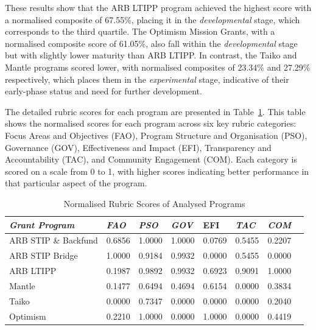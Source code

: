 \documentclass[conference]{IEEEtran}
\begin{document}
These results show that the ARB LTIPP program achieved the highest score with a normalised composite of 67.55\%, placing it in the \textit{developmental} stage, which corresponds to the third quartile. The Optimism Mission Grants, with a normalised composite score of 61.05\%, also fall within the \textit{developmental} stage but with slightly lower maturity than ARB LTIPP. In contrast, the Taiko and Mantle programs scored lower, with normalised composites of 23.34\% and 27.29\% respectively, which places them in the \textit{experimental} stage, indicative of their early-phase status and need for further development.

The detailed rubric scores for each program are presented in Table~\ref{tab:rubric_scores}. This table shows the normalised scores for each program across six key rubric categories: Focus Areas and Objectives (FAO), Program Structure and Organisation (PSO), Governance (GOV), Effectiveness and Impact (EFI), Transparency and Accountability (TAC), and Community Engagement (COM). Each category is scored on a scale from 0 to 1, with higher scores indicating better performance in that particular aspect of the program.

\begin{table}[htbp]
\caption{Normalised Rubric Scores of Analysed Programs}
\begin{center}
\footnotesize
\begin{tabular}{p{2.9cm}p{0.5cm}p{0.5cm}p{0.5cm}p{0.5cm}p{0.5cm}p{0.5cm}p{0.5cm}}
\hline
\textbf{\textit{Grant Program}} & \textbf{\textit{FAO}} & \textbf{\textit{PSO}} & \textbf{\textit{GOV}} & \textbf{EFI} & \textbf{\textit{TAC}} & \textbf{\textit{COM}} \\
\hline
ARB STIP \& Backfund & 0.6856 & 1.0000 & 1.0000 & 0.0769 & 0.5455 & 0.2207 \\
ARB STIP Bridge & 1.0000 & 0.9184 & 0.9932 & 0.0000 & 0.5455 & 0.0000 \\
ARB LTIPP & 0.1987 & 0.9892 & 0.9932 & 0.6923 & 0.9091 & 1.0000 \\
Mantle & 0.1477 & 0.6494 & 0.4694 & 0.6154 & 0.0000 & 0.3834 \\
Taiko & 0.0000 & 0.7347 & 0.0000 & 0.0000 & 0.0000 & 0.2040 \\
Optimism & 0.2210 & 1.0000 & 0.0000 & 1.0000 & 0.0000 & 0.4419 \\
\hline
\end{tabular}
\end{center}
\label{tab:rubric_scores}
\end{table}
\end{document}
